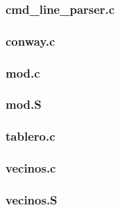 \documentclass[a4paper,12pt]{article}
\numberwithin{equation}{section}
\numberwithin{figure}{section}
\begin{document}
\subsubsection{cmd\_line\_parser.c}\label{app_cmd_line_parser}

\clearpage

\subsubsection{conway.c}\label{app_main}

\clearpage

\subsubsection{mod.c}\label{app_mod}

\clearpage

\subsubsection{mod.S}\label{app_mod_s}

\clearpage

\subsubsection{tablero.c}\label{app_tablero}

\clearpage

\subsubsection{vecinos.c}\label{app_vecinos}

\clearpage

\subsubsection{vecinos.S}\label{app_vecinos_s}

\clearpage
\end{document}
